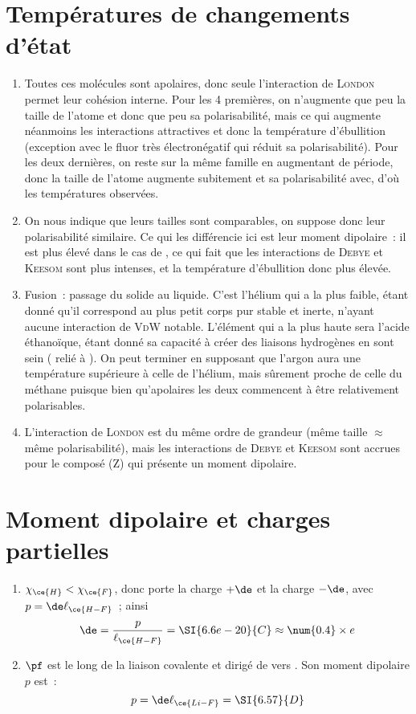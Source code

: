 \documentclass[a4paper, 12pt, final, garamond]{book}
\begin{document}
\section{Températures de changements d'état}
\begin{enumerate}
    \item Toutes ces molécules sont apolaires, donc seule l'interaction de
        \textsc{London} permet leur cohésion interne. Pour les 4 premières, on
        n'augmente que peu la taille de l'atome et donc que peu sa
        polarisabilité, mais ce qui augmente néanmoins les interactions
        attractives et donc la température d'ébullition (exception avec le fluor
        très électronégatif qui réduit sa polarisabilité). Pour les deux
        dernières, on reste sur la même famille en augmentant de période, donc
        la taille de l'atome augmente subitement et sa polarisabilité avec, d'où
        les températures observées.
    \item On nous indique que leurs tailles sont comparables, on suppose donc
        leur polarisabilité similaire. Ce qui les différencie ici est leur
        moment dipolaire~: il est plus élevé dans le cas de , ce qui
        fait que les interactions de \textsc{Debye} et \textsc{Keesom} sont plus
        intenses, et la température d'ébullition donc plus élevée.
    \item Fusion~: passage du solide au liquide. C'est l'hélium qui a la plus
        faible, étant donné qu'il correspond au plus petit corps pur stable et
        inerte, n'ayant aucune interaction de \textsc{VdW} notable. L'élément
        qui a la plus haute sera l'acide éthanoïque, étant donné sa capacité à
        créer des liaisons hydrogènes en sont sein ( relié à ). On
        peut terminer en supposant que l'argon aura une température supérieure à
        celle de l'hélium, mais sûrement proche de celle du méthane puisque
        bien qu'apolaires les deux commencent à être relativement polarisables.
    \item L'interaction de \textsc{London} est du même ordre de grandeur (même
        taille $\approx$ même polarisabilité), mais les interactions de
        \textsc{Debye} et \textsc{Keesom} sont accrues pour le composé (Z) qui
        présente un moment dipolaire.
\end{enumerate}

\section{Moment dipolaire et charges partielles}
\begin{enumerate}
    \item $\chi_{\ce{H}} < \chi_{\ce{F}}$, donc  porte la charge $+\de$
        et  la charge $-\de$, avec $p = \de\ell_{\ce{H-F}}$~; ainsi
        \[
            \de = \frac{p}{\ell_{\ce{H-F}}} = \SI{6.6e-20}{C} \approx
            \num{0.4}\times e
        \]
    \item $\pf$ est le long de la liaison covalente et dirigé de  vers
        . Son moment dipolaire $p$ est~:
        \[p = \de\ell_{\ce{Li-F}} = \SI{6.57}{D}\]
\end{enumerate}
\end{document}
